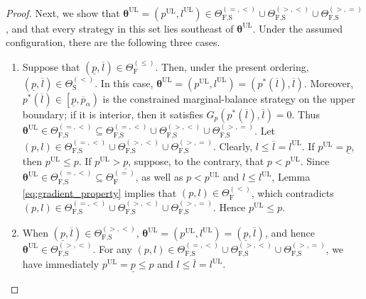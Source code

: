 \documentclass[a4paper,12pt]{article}
\begin{document}
\begin{proof}
Next, we show that ${\bm\theta}^{\text{UL}}=\left(p^{\text{UL}},l^{\text{UL}}\right)\in\Theta_{\text{F,S}}^{\left(=,<\right)}\cup\Theta_{\text{F,S}}^{\left(>,<\right)}\cup\Theta_{\text{F,S}}^{\left(>,=\right)}$, and that every strategy in this set lies southeast of ${\bm\theta}^{\text{UL}}$. Under the assumed configuration, there are the following three cases.
\begin{enumerate}
\item[(I)] Suppose that $\left(\underline{p},\overline{l}\right)\in\Theta_{\text{F}}^{\left(\leq\right)}$. Then, under the present ordering, $\left(\underline{p},\overline{l}\right)\in\Theta_{\text{S}}^{\left(<\right)}$. In this case, ${\bm\theta}^{\text{UL}}=\left(p^{\text{UL}},l^{\text{UL}}\right)=\left(p^*\left(\overline{l}\right),\overline{l}\right)$. Moreover, $p^*\left(\overline{l}\right)\in\left[\underline{p},\overline{p}_{\alpha}\right)$ is the constrained marginal-balance strategy on the upper boundary; if it is interior, then it satisfies $G_p\left(p^*\left(\overline{l}\right),\overline{l}\right)=0$. Thus ${\bm\theta}^{\text{UL}}\in\Theta_{\text{F,S}}^{\left(=,<\right)}\subseteq\Theta_{\text{F,S}}^{\left(=,<\right)}\cup\Theta_{\text{F,S}}^{\left(>,<\right)}\cup\Theta_{\text{F,S}}^{\left(>,=\right)}$. Let $\left(p,l\right)\in\Theta_{\text{F,S}}^{\left(=,<\right)}\cup\Theta_{\text{F,S}}^{\left(>,<\right)}\cup\Theta_{\text{F,S}}^{\left(>,=\right)}$. Clearly, $l\leq\overline{l}=l^{\text{UL}}$. If $p^{\text{UL}}=\underline{p}$, then $p^{\text{UL}}\leq p$. If $p^{\text{UL}}>\underline{p}$, suppose, to the contrary, that $p<p^{\text{UL}}$. Since ${\bm\theta}^{\text{UL}}\in\Theta_{\text{F,S}}^{\left(=,<\right)}\subseteq\Theta_{\text{F}}^{\left(=\right)}$, as well as $p<p^{\text{UL}}$ and $l\leq l^{\text{UL}}$, Lemma \ref{eq:gradient_property} implies that $\left(p,l\right)\in\Theta_{\text{F}}^{\left(<\right)}$, which contradicts $\left(p,l\right)\in\Theta_{\text{F,S}}^{\left(=,<\right)}\cup\Theta_{\text{F,S}}^{\left(>,<\right)}\cup\Theta_{\text{F,S}}^{\left(>,=\right)}$. Hence $p^{\text{UL}}\leq p$.
\item[(II)] When $\left(\underline{p},\overline{l}\right)\in\Theta_{\text{F,S}}^{\left(>,<\right)}$, ${\bm\theta}^{\text{UL}}=\left(p^{\text{UL}},l^{\text{UL}}\right)=\left(\underline{p},\overline{l}\right)$, and hence ${\bm\theta}^{\text{UL}}\in\Theta_{\text{F,S}}^{\left(>,<\right)}$. For any $\left(p,l\right)\in\Theta_{\text{F,S}}^{\left(=,<\right)}\cup\Theta_{\text{F,S}}^{\left(>,<\right)}\cup\Theta_{\text{F,S}}^{\left(>,=\right)}$, we have immediately $p^{\text{UL}}=\underline{p}\leq p$ and $l\leq\overline{l}=l^{\text{UL}}$.

\end{enumerate}
\end{proof}
\end{document}
